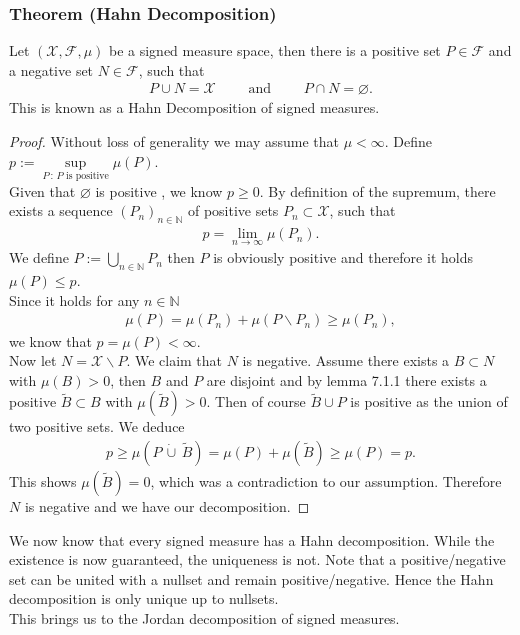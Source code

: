 \documentclass[11pt,a4paper]{article}
\begin{document}
\subsubsection{Theorem (Hahn Decomposition)}
Let $(\mathcal{X,F},\mu)$ be a signed measure space, then there is a positive set $P\in\mathcal{F}$ and a negative set $N\in\mathcal{F}$, such that
\begin{align*}
P\cup{}N = \mathcal{X}\qquad \text{ and }\qquad P\cap{}N=\varnothing.
\end{align*}
This is known as a Hahn Decomposition of signed measures.
\begin{proof}
Without loss of generality we may assume that $\mu<\infty$. Define $p:=\sup\limits_{P\,:\,P\text{ is positive}} \mu(P)$. \vspace{1em}\\Given that $\varnothing$ is positive , we know $p\geq{}0$. By definition of the supremum, there exists a sequence $(P_n)_{n\in\mathbb{N}}$ of positive sets $P_n\subset\mathcal{X}$, such that 
\begin{align*}
p = \lim\limits_{n\rightarrow\infty}\mu(P_n).
\end{align*}
We define $P:=\bigcup\limits_{n\in\mathbb{N}}P_n$ then $P$ is obviously positive and therefore it holds $\mu(P)\leq{}p$. \vspace{1em}\\Since it holds for any $n\in\mathbb{N}$
\begin{align*}
\mu(P) = \mu(P_n) + \mu(P\backslash{}P_n) \geq \mu(P_n),
\end{align*}
we know that $p=\mu(P)<\infty$. \vspace{1em}\\Now let $N=\mathcal{X}\backslash{}P$. We claim that $N$ is negative. Assume there exists a $B\subset{}N$ with $\mu(B)>0$, then $B$ and $P$ are disjoint and by lemma 7.1.1 there exists a positive $\tilde{B}\subset{}B$ with $\mu(\tilde{B})>0$. Then of course $\tilde{B}\cup{}P$ is positive as the union of two positive sets. We deduce 
\begin{align*}
p\geq{}\mu(P\,\dot{\cup}\,\tilde{B})=\mu(P)+\mu(\tilde{B})\geq\mu(P)=p.
\end{align*}
This shows $\mu(\tilde{B})=0$, which was a contradiction to our assumption. Therefore $N$ is negative and we have our decomposition.\end{proof}
\noindent{}We now know that every signed measure has a Hahn decomposition. While the existence is now guaranteed, the uniqueness is not. Note that a positive/negative set can be united with a nullset and remain positive/negative. Hence the Hahn decomposition is only unique up to nullsets.\vspace{2em}\\
This brings us to the Jordan decomposition of signed measures.
\end{document}
